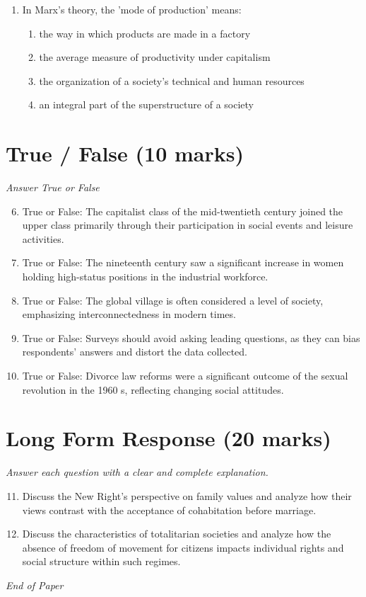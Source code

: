 \documentclass[12pt]{article}
\begin{document}
\begin{enumerate}[label=\arabic*.]
\begin{enumerate}[label=(\alph*)]
    \item increasingly detached from health authorities and providers of private health care
    \item less inclined to run themselves efficiently, as demand for health care was falling
\end{enumerate}
\item In Marx's theory, the 'mode of production' means:
\begin{enumerate}[label=(\alph*)]
    \item the way in which products are made in a factory
    \item the average measure of productivity under capitalism
    \item the organization of a society's technical and human resources
    \item an integral part of the superstructure of a society
\end{enumerate}
\end{enumerate}

\section*{True / False (10 marks)}
\textit{Answer True or False}
\begin{enumerate}[label=\arabic*.]
\setcounter{enumi}{5}
\item True or False: The capitalist class of the mid-twentieth century joined the upper class primarily through their participation in social events and leisure activities.
\item True or False: The nineteenth century saw a significant increase in women holding high-status positions in the industrial workforce.
\item True or False: The global village is often considered a level of society, emphasizing interconnectedness in modern times.
\item True or False: Surveys should avoid asking leading questions, as they can bias respondents' answers and distort the data collected.
\item True or False: Divorce law reforms were a significant outcome of the sexual revolution in the 1960 s, reflecting changing social attitudes.
\end{enumerate}

\section*{Long Form Response (20 marks)}
\textit{Answer each question with a clear and complete explanation.}
\begin{enumerate}[label=\arabic*.]
\setcounter{enumi}{10}
\item Discuss the New Right's perspective on family values and analyze how their views contrast with the acceptance of cohabitation before marriage.
\item Discuss the characteristics of totalitarian societies and analyze how the absence of freedom of movement for citizens impacts individual rights and social structure within such regimes.
\end{enumerate}

\vfill
\noindent\textit{End of Paper}
\end{document}
